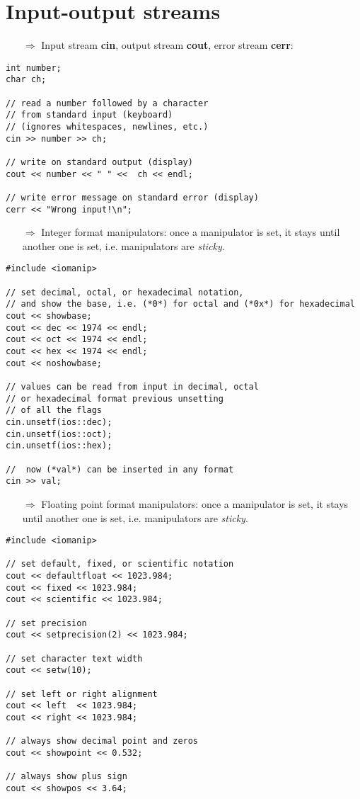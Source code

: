 \documentclass[10pt]{article}
\begin{document}
\section{Input-output streams}
\small
\begin{enumerate}
\item[$\Rightarrow$] Input stream \textbf{cin}, output stream \textbf{cout}, error stream \textbf{cerr}:
\end{enumerate}
\begin{lstlisting}
int number;
char ch;

// read a number followed by a character
// from standard input (keyboard)
// (ignores whitespaces, newlines, etc.)
cin >> number >> ch;

// write on standard output (display)
cout << number << " " <<  ch << endl;

// write error message on standard error (display)
cerr << "Wrong input!\n";
\end{lstlisting}
\begin{enumerate}
\item[$\Rightarrow$] Integer format manipulators: once a  manipulator is set, it stays until another one is set, i.e. manipulators are \emph{sticky}.
\end{enumerate}
\begin{lstlisting}
#include <iomanip>

// set decimal, octal, or hexadecimal notation,
// and show the base, i.e. (*0*) for octal and (*0x*) for hexadecimal
cout << showbase;
cout << dec << 1974 << endl;
cout << oct << 1974 << endl;
cout << hex << 1974 << endl;
cout << noshowbase;

// values can be read from input in decimal, octal
// or hexadecimal format previous unsetting
// of all the flags
cin.unsetf(ios::dec);
cin.unsetf(ios::oct);
cin.unsetf(ios::hex);

//  now (*val*) can be inserted in any format
cin >> val;
\end{lstlisting}
\begin{enumerate}
\item[$\Rightarrow$] Floating point format manipulators:  once a  manipulator is set, it stays until another one is set, i.e. manipulators are \emph{sticky}.
\end{enumerate}
\begin{lstlisting}
#include <iomanip>

// set default, fixed, or scientific notation
cout << defaultfloat << 1023.984;
cout << fixed << 1023.984;
cout << scientific << 1023.984;

// set precision
cout << setprecision(2) << 1023.984;

// set character text width
cout << setw(10);

// set left or right alignment
cout << left  << 1023.984;
cout << right << 1023.984;

// always show decimal point and zeros
cout << showpoint << 0.532;

// always show plus sign
cout << showpos << 3.64;
\end{lstlisting}
\end{document}
